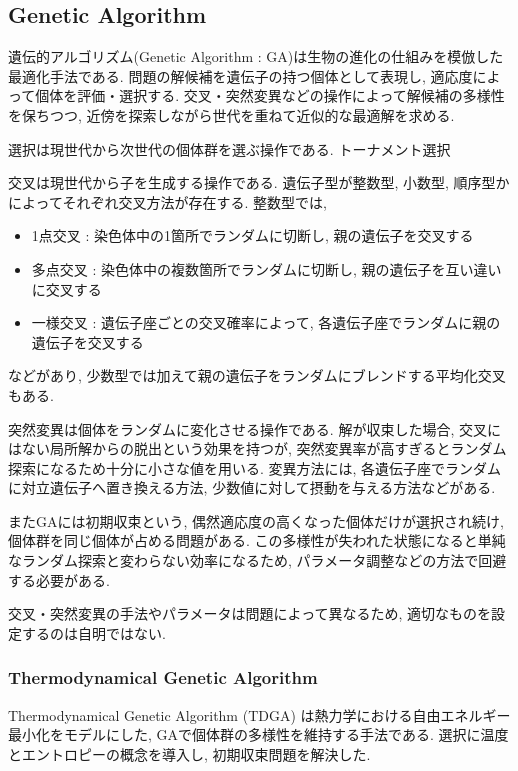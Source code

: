 \changeindent{0cm}
\subsection{Genetic Algorithm}
\changeindent{2cm}
\label{sec:02_ga}
遺伝的アルゴリズム(Genetic Algorithm : GA)は生物の進化の仕組みを模倣した最適化手法である.
問題の解候補を遺伝子の持つ個体として表現し, 適応度によって個体を評価・選択する.
交叉・突然変異などの操作によって解候補の多様性を保ちつつ,
近傍を探索しながら世代を重ねて近似的な最適解を求める.


選択は現世代から次世代の個体群を選ぶ操作である.
トーナメント選択

交叉は現世代から子を生成する操作である.
遺伝子型が整数型, 小数型, 順序型かによってそれぞれ交叉方法が存在する.
整数型では,
\begin{itemize}
  \item 1点交叉 : 染色体中の1箇所でランダムに切断し, 親の遺伝子を交叉する
  \item 多点交叉 : 染色体中の複数箇所でランダムに切断し, 親の遺伝子を互い違いに交叉する
  \item 一様交叉 : 遺伝子座ごとの交叉確率によって, 各遺伝子座でランダムに親の遺伝子を交叉する
\end{itemize}
などがあり, 少数型では加えて親の遺伝子をランダムにブレンドする平均化交叉もある.

突然変異は個体をランダムに変化させる操作である.
解が収束した場合, 交叉にはない局所解からの脱出という効果を持つが,
突然変異率が高すぎるとランダム探索になるため十分に小さな値を用いる.
変異方法には, 各遺伝子座でランダムに対立遺伝子へ置き換える方法, 少数値に対して摂動を与える方法などがある.

またGAには初期収束という, 偶然適応度の高くなった個体だけが選択され続け,
個体群を同じ個体が占める問題がある.
この多様性が失われた状態になると単純なランダム探索と変わらない効率になるため,
パラメータ調整などの方法で回避する必要がある.

交叉・突然変異の手法やパラメータは問題によって異なるため, 適切なものを設定するのは自明ではない.

\changeindent{0cm}
\subsubsection{Thermodynamical Genetic Algorithm}
\changeindent{2cm}
\label{sec:02_tdga}

Thermodynamical Genetic Algorithm (TDGA) \cite{kita1996multi} は熱力学における自由エネルギー最小化をモデルにした,
GAで個体群の多様性を維持する手法である.
選択に温度とエントロピーの概念を導入し, 初期収束問題を解決した.

